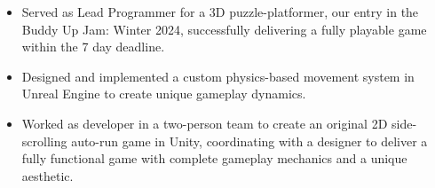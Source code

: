 \documentclass[10pt,a4paper,ragged2e,withhyper]{altacv}
\begin{document}
\begin{paracol}{2}
        \vspace{-1em}
            \vspace{-0.5em}
            \begin{itemize}
            \item Served as Lead Programmer for a 3D puzzle-platformer, our entry in the Buddy Up Jam: Winter 2024, successfully delivering a fully playable game within the 7 day deadline.
            \item Designed and implemented a custom physics-based movement system in Unreal Engine to create unique gameplay dynamics.
            \end{itemize}
            \vspace{-0.5em}
            \divider
            \vspace{0.5em}
            \vspace{-0.5em}
            \begin{itemize}
            \item Worked as developer in a two-person team to create an original 2D side-scrolling auto-run game in Unity, coordinating with a designer to deliver a fully functional game with complete gameplay mechanics and a unique aesthetic.
            \end{itemize}
        \end{paracol}
        \newpage

        \makecvheader
\end{document}

